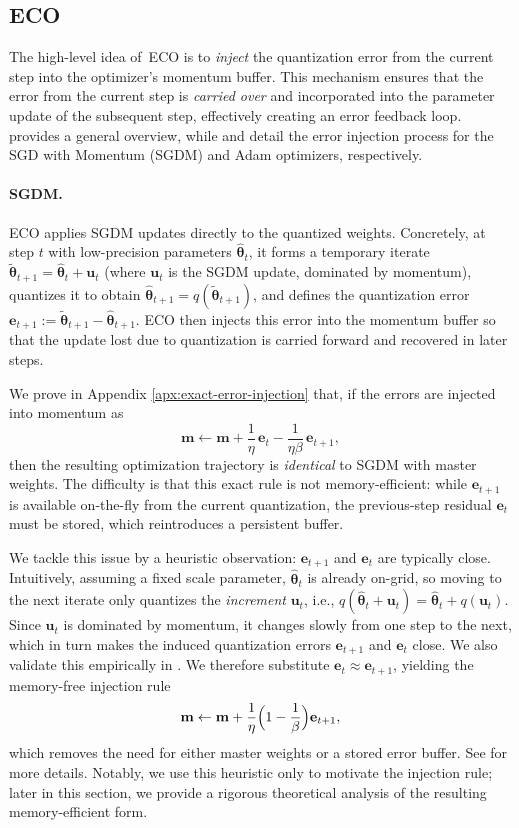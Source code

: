 \documentclass[11pt, a4paper, onecolumn, copyright, goog]{google}
\newcommand{\methodname}{ECO}
\newcommand{\vect}[1]{\mathbf{#1}}
\newcommand{\vtheta}{\boldsymbol{\theta}}
\newcommand{\vm}{\vect{m}}
\newcommand{\ve}{\vect{e}}
\newcommand{\vu}{\vect{u}}
\newcommand{\qfn}{\textit{q}}
\theoremstyle{plain}
\theoremstyle{definition}
\theoremstyle{remark}
\begin{document}
\subsection{\methodname{}}
The high-level idea of~\methodname{} is to \textit{inject} the quantization error from the current step into the optimizer's momentum buffer. This mechanism ensures that the error from the current step is \textit{carried over} and incorporated into the parameter update of the subsequent step, effectively creating an error feedback loop.  provides a general overview, while  and  detail the error injection process for the SGD with Momentum (SGDM) and Adam optimizers, respectively.

\paragraph{SGDM.}
ECO applies SGDM updates directly to the quantized weights. Concretely, at step $t$ with low-precision parameters $\hat{\vtheta}_t$, it forms a temporary iterate $\tilde{\vtheta}_{t+1}=\hat{\vtheta}_t+\vu_t$ (where $\vu_t$ is the SGDM update, dominated by momentum), quantizes it to obtain $\hat{\vtheta}_{t+1}=\qfn(\tilde{\vtheta}_{t+1})$, and defines the quantization error $\ve_{t+1} := \tilde{\vtheta}_{t+1}-\hat{\vtheta}_{t+1}$. ECO then injects this error into the momentum buffer so that the update lost due to quantization is carried forward and recovered in later steps.

We prove in Appendix \ref{apx:exact-error-injection} that, if the errors are injected into momentum as
$$
\vm \leftarrow \vm + \frac{1}{\eta}\,\ve_{t} - \frac{1}{\eta\beta}\,\ve_{t+1},
$$
then the resulting optimization trajectory is \emph{identical} to SGDM with master weights. The difficulty is that this exact rule is not memory-efficient: while $\ve_{t+1}$ is available on-the-fly from the current quantization, the previous-step residual $\ve_{t}$ must be stored, which reintroduces a persistent buffer.

We tackle this issue by a heuristic observation: $\ve_{t+1}$ and $\ve_{t}$ are typically close. Intuitively, assuming a fixed scale parameter, $\hat{\vtheta}_t$ is already on-grid, so moving to the next iterate only quantizes the \emph{increment} $\vu_t$, i.e., $\qfn(\hat{\vtheta}_t + \vu_t) = \hat{\vtheta}_t + \qfn(\vu_t)$. Since $\vu_t$ is dominated by momentum, it changes slowly from one step to the next, which in turn makes the induced quantization errors $\ve_{t+1}$ and $\ve_t$ close.
We also validate this empirically in .
We therefore substitute $\ve_{t}\approx \ve_{t+1}$, yielding the memory-free injection rule
$$
\vm \leftarrow \vm + \frac{1}{\eta}\Bigl(1-\frac{1}{\beta}\Bigr)\ve_{t+1},
$$
which removes the need for either master weights or a stored error buffer. See  for more details. Notably, we use this heuristic only to motivate the injection rule; later in this section, we provide a rigorous theoretical analysis of the resulting memory-efficient form.
\end{document}
